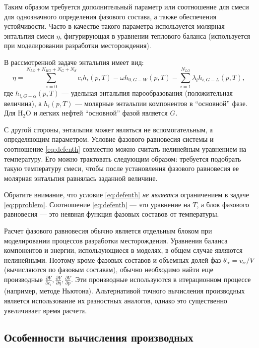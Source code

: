 \documentclass[12pt]{article}
\newcommand{\pd}[2]{\frac{\partial #1}{\partial #2}}
\begin{document}
Таким образом требуется дополнительный параметр или соотношение для смеси для однозначного определения фазового состава, а также обеспечения устойчивости. Часто в качестве такого параметра используется молярная энтальпия смеси $\eta$, фигурирующая в уравнении теплового баланса (используется при моделировании разработки месторождения).

В рассмотренной задаче энтальпия имеет вид:
\begin{equation}
\eta = 
\sum_{i=0}^{N_{LO}+N_{HO}+N_{G}+N_{S}} c_i h_i(p,T) -\omega h_{0,G-W}(p,T) -\sum_{i=1}^{N_{LO}} \lambda_i h_{i,G-L}(p,T) 
,
\label{eq:defenth}
\end{equation}
где $h_{i,G-\alpha}(p,T)$ --- удельная энтальпия парообразования (положительная величина), а $h_i(p,T)$ --- молярные энтальпии компонентов в ``основной'' фазе. Для $\mathrm{H_2O}$ и легких нефтей ``основной'' фазой является $G$.

С другой стороны, энтальпия может являться не вспомогательным, а определяющим параметром. Условие фазового равновесия системы и соотношение \eqref{eq:defenth} совместно можно считать нелинейным уравнением на температуру. Его можно трактовать следующим образом: требуется подобрать такую температуру смеси, чтобы после установления фазового равновесия ее молярная энтальпия равнялась заданной величине.

Обратите внимание, что условие \eqref{eq:defenth} \emph{не является} ограничением в задаче \eqref{eq:pproblem}. Соотношение \eqref{eq:defenth} --- это уравнение на $T$, а блок фазового равновесия --- это неявная функция фазовых составов от температуры.

Расчет фазового равновесия обычно является отдельным блоком при моделировании процессов разработки месторождения. Уравнения баланса компонентов и энергии, использующиеся в моделях, в общем случае являются нелинейными. Поэтому кроме фазовых составов и объемных долей фаз $\theta_\alpha = {v_\alpha}/{V}$ (вычисляются по фазовым составам), обычно необходимо найти еще
производные $\pd{V}{c_i}, \pd{V}{\eta}, \pd{V}{p}$. Эти производные используются в итерационном процессе (например, методе Ньютона). Альтернативой точного вычисления производных является использование их разностных аналогов, однако это существенно увеличивает время расчета.

\subsection{Особенности вычисления производных}
\end{document}

